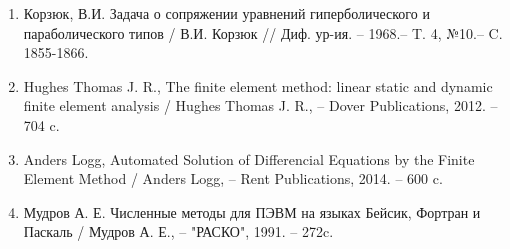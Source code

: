 \begin{enumerate}
\item Корзюк, В.И. Задача о сопряжении уравнений гиперболического и параболического типов / В.И. Корзюк // Диф. ур-ия. -- 1968.-- T. 4, №10.-- C. 1855-1866.
\item Hughes Thomas J. R.,
			{The finite element method: linear static and dynamic finite element analysis} /
			Hughes Thomas J. R., -- Dover Publications, 2012. -- 704 c.
\item Anders Logg,
			{Automated Solution of Differencial Equations by the Finite Element Method} /
			Anders Logg, -- Rent Publications, 2014. -- 600 c.
\item Мудров А. Е. Численные методы для ПЭВМ на языках Бейсик, Фортран и Паскаль / Мудров А. Е., -- "РАСКО", 1991. -- 272c.
\end{enumerate}
